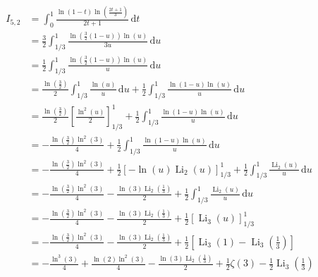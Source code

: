 \begin{align}
I_{5,2}
&=\int_{0}^{1}\frac{\ln{(1-t)}\ln{\left(\frac{2t+1}{3}\right)}}{2t+1}\,\mathrm{d}t\\
&=\frac32\int_{1/3}^{1}\frac{\ln{\left(\frac32(1-u)\right)}\ln{\left(u\right)}}{3u}\,\mathrm{d}u\\
&=\frac12\int_{1/3}^{1}\frac{\ln{\left(\frac32(1-u)\right)}\ln{\left(u\right)}}{u}\,\mathrm{d}u\\
&=\frac{\ln{\left(\frac32\right)}}{2}\int_{1/3}^{1}\frac{\ln{\left(u\right)}}{u}\,\mathrm{d}u+\frac12\int_{1/3}^{1}\frac{\ln{\left(1-u\right)}\ln{\left(u\right)}}{u}\,\mathrm{d}u\\
&=\frac{\ln{\left(\frac32\right)}}{2}\left[\frac{\ln^2{\left(u\right)}}{2}\right]_{1/3}^{1}+\frac12\int_{1/3}^{1}\frac{\ln{\left(1-u\right)}\ln{\left(u\right)}}{u}\,\mathrm{d}u\\
&=-\frac{\ln{\left(\frac32\right)}\ln^2{\left(3\right)}}{4}+\frac12\int_{1/3}^{1}\frac{\ln{\left(1-u\right)}\ln{\left(u\right)}}{u}\,\mathrm{d}u\\
&=-\frac{\ln{\left(\frac32\right)}\ln^2{\left(3\right)}}{4}+\frac12\left[-\ln{\left(u\right)}\operatorname{Li}_{2}{\left(u\right)}\right]_{1/3}^{1}+\frac12\int_{1/3}^{1}\frac{\operatorname{Li}_{2}{\left(u\right)}}{u}\,\mathrm{d}u\\
&=-\frac{\ln{\left(\frac32\right)}\ln^2{\left(3\right)}}{4}-\frac{\ln{(3)}\operatorname{Li}_{2}{\left(\frac13\right)}}{2}+\frac12\int_{1/3}^{1}\frac{\operatorname{Li}_{2}{\left(u\right)}}{u}\,\mathrm{d}u\\
&=-\frac{\ln{\left(\frac32\right)}\ln^2{\left(3\right)}}{4}-\frac{\ln{(3)}\operatorname{Li}_{2}{\left(\frac13\right)}}{2}+\frac12\left[\operatorname{Li}_{3}{\left(u\right)}\right]_{1/3}^{1}\\
&=-\frac{\ln{\left(\frac32\right)}\ln^2{\left(3\right)}}{4}-\frac{\ln{(3)}\operatorname{Li}_{2}{\left(\frac13\right)}}{2}+\frac12\left[\operatorname{Li}_{3}{\left(1\right)}-\operatorname{Li}_{3}{\left(\frac13\right)}\right]\\
&=-\frac{\ln^3{\left(3\right)}}{4}+\frac{\ln{(2)}\ln^2{\left(3\right)}}{4}-\frac{\ln{(3)}\operatorname{Li}_{2}{\left(\frac13\right)}}{2}+\frac12\zeta{(3)}-\frac12\operatorname{Li}_{3}{\left(\frac13\right)}\\
\end{align}